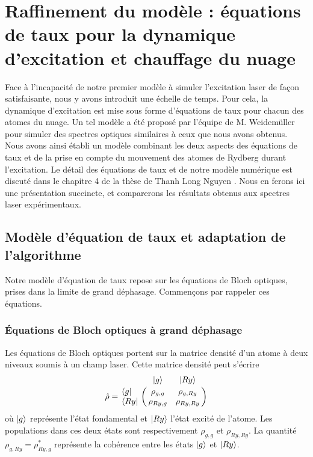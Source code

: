 \section{Raffinement du modèle : équations de taux pour la dynamique d'excitation et chauffage du nuage}
\noindent Face à l'incapacité de notre premier modèle à simuler l'excitation laser de façon satisfaisante, nous y avons introduit une échelle de temps.
Pour cela, la dynamique d'excitation est mise sous forme d'équations de taux pour chacun des atomes du nuage.
Un tel modèle a été proposé par l'équipe de M. Weidemüller \cite{MX_WEIDEMULLERRYDAGREGATES14} pour simuler des spectres optiques similaires à ceux que nous avons obtenus.
Nous avons ainsi établi un modèle combinant les deux aspects des équations de taux et de la prise en compte du mouvement des atomes de Rydberg durant l'excitation.
Le détail des équations de taux et de notre modèle numérique est discuté dans le chapitre 4 de la thèse de Thanh Long Nguyen \cite{PHD_NGUYEN}.
Nous en ferons ici une présentation succincte, et comparerons les résultats obtenus aux spectres laser expérimentaux.
	
	\subsection{Modèle d'équation de taux et adaptation de l'algorithme}\label{subsec:rate_equation}
\noindent Notre modèle d'équation de taux repose sur les équations de Bloch optiques, prises dans la limite de grand déphasage.
Commençons par rappeler ces équations.

\subsubsection*{Équations de Bloch optiques à grand déphasage}
\noindent Les équations de Bloch optiques portent sur la matrice densité d'un atome à deux niveaux soumis à un champ laser.
Cette matrice densité peut s'écrire
\begin{equation}
\label{eq:density_matrix_Bloch}
\hat{\rho} = \bordermatrix{~ 	&\ket{g} 	& \ket{Ry} \cr
	\bra{g}		&\rho_{g,g}		&\rho_{g,Ry}	\cr 
	\bra{Ry} 		&\rho_{Ry,g}		&\rho_{Ry,Ry} \cr}
\end{equation}
où $\ket{g}$ représente l'état fondamental et $\ket{Ry}$ l'état excité de l'atome.
Les populations dans ces deux états sont respectivement $\rho_{g,g}$ et $\rho_{Ry,Ry}$.
La quantité $\rho_{g,Ry} = \rho_{Ry,g}^*$ représente la cohérence entre les états $\ket{g}$ et $\ket{Ry}$.

